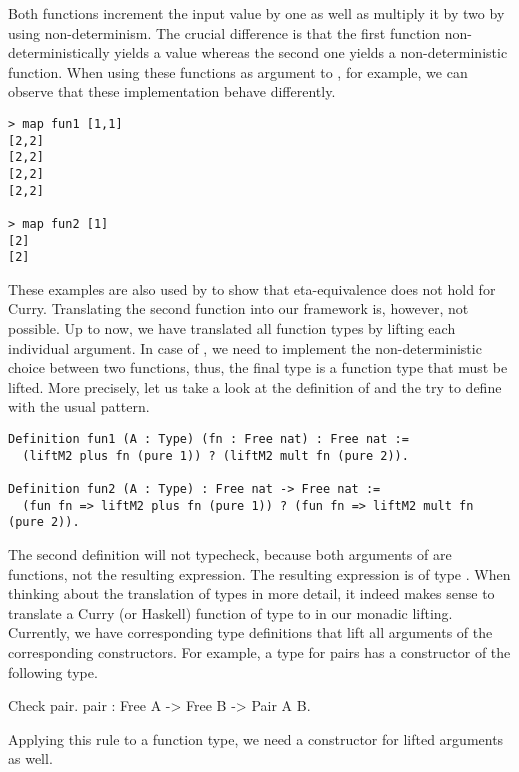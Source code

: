 Both functions increment the input value by one as well as multiply it by two by using non\--determinism.
The crucial difference is that the first function non\--deterministically yields a value whereas the second one yields a non\--deterministic function.
When using these functions as argument to , for example, we can observe that these implementation behave differently.

\begin{verbatim}
> map fun1 [1,1]
[2,2]
[2,2]
[2,2]
[2,2]

> map fun2 [1]
[2]
[2]
\end{verbatim}

These examples are also used by \citet{mehner2014parametricity} to show that eta\--equivalence does not hold for Curry.
Translating the second function into our framework is, however, not possible.
Up to now, we have translated all function types by lifting each individual argument.
In case of , we need to implement the non\--deterministic choice between two functions, thus, the final type is a function type that must be lifted.
More precisely, let us take a look at the definition of  and the try to define  with the usual pattern.

\begin{verbatim}
Definition fun1 (A : Type) (fn : Free nat) : Free nat :=
  (liftM2 plus fn (pure 1)) ? (liftM2 mult fn (pure 2)).

Definition fun2 (A : Type) : Free nat -> Free nat :=
  (fun fn => liftM2 plus fn (pure 1)) ? (fun fn => liftM2 mult fn (pure 2)).
\end{verbatim}

The second definition will not typecheck, because both arguments of  are functions, not the resulting expression.
The resulting expression is of type .
When thinking about the translation of types in more detail, it indeed makes sense to translate a Curry (or Haskell) function of type  to  in our monadic lifting.
Currently, we have corresponding type definitions that lift all arguments of the corresponding constructors.
For example, a type for pairs has a constructor  of the following type.

\begin{crepl}
\coqrepl Check pair.
  pair : Free A -> Free B -> Pair A B.
\end{crepl}

Applying this rule to a function type, we need a constructor for lifted arguments as well.

